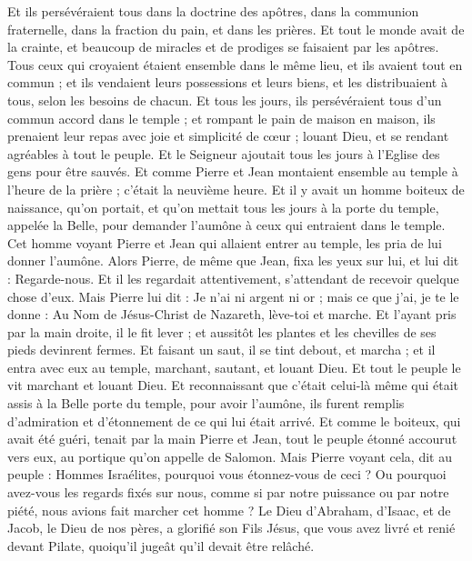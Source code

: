 \begin{multicols}{2}
{Et ils persévéraient tous dans la doctrine des apôtres, dans la communion fraternelle, dans la fraction du pain, et dans les prières.
Et tout le monde avait de la crainte, et beaucoup de miracles et de prodiges se faisaient par les apôtres.
Tous ceux qui croyaient étaient ensemble dans le même lieu, et ils avaient tout en commun ;
et ils vendaient leurs possessions et leurs biens, et les distribuaient à tous, selon les besoins de chacun.
Et tous les jours, ils persévéraient tous d'un commun accord dans le temple ; et rompant le pain de maison en maison, ils prenaient leur repas avec joie et simplicité de cœur ;
louant Dieu, et se rendant agréables à tout le peuple. Et le Seigneur ajoutait tous les jours à l'Eglise des gens pour être sauvés.
\VerseOne{}Et comme Pierre et Jean montaient ensemble au temple à l'heure de la prière ; c'était la neuvième heure.
Et il y avait un homme boiteux de naissance, qu'on portait, et qu'on mettait tous les jours à la porte du temple, appelée la Belle, pour demander l'aumône à ceux qui entraient dans le temple. 
Cet homme voyant Pierre et Jean qui allaient entrer au temple, les pria de lui donner l'aumône.
Alors Pierre, de même que Jean, fixa les yeux sur lui, et lui dit : Regarde-nous.
Et il les regardait attentivement, s'attendant de recevoir quelque chose d'eux.
Mais Pierre lui dit : Je n'ai ni argent ni or ; mais ce que j'ai, je te le donne : Au Nom de Jésus-Christ de Nazareth, lève-toi et marche.
Et l'ayant pris par la main droite, il le fit lever ; et aussitôt les plantes et les chevilles de ses pieds devinrent fermes.
Et faisant un saut, il se tint debout, et marcha ; et il entra avec eux au temple, marchant, sautant, et louant Dieu.
Et tout le peuple le vit marchant et louant Dieu.
Et reconnaissant que c'était celui-là même qui était assis à la Belle porte du temple, pour avoir l'aumône, ils furent remplis d'admiration et d'étonnement de ce qui lui était arrivé.
Et comme le boiteux, qui avait été guéri, tenait par la main Pierre et Jean, tout le peuple étonné accourut vers eux, au portique qu'on appelle de Salomon.
Mais Pierre voyant cela, dit au peuple : Hommes Israélites, pourquoi vous étonnez-vous de ceci ? Ou pourquoi avez-vous les regards fixés sur nous, comme si par notre puissance ou par notre piété, nous avions fait marcher cet homme ?
Le Dieu d'Abraham, d'Isaac, et de Jacob, le Dieu de nos pères, a glorifié son Fils Jésus, que vous avez livré et renié devant Pilate, quoiqu'il jugeât qu'il devait être relâché.
}
\end{multicols}

